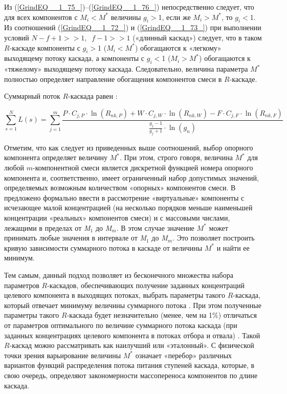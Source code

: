 Из (\ref{GrindEQ__1_75_})--(\ref{GrindEQ__1_76_}) непосредственно следует, что для всех компонентов с $M_{i} $$\mathrm{<}$$M^{*} $ величины $g_{i} $$\mathrm{>}$1, если же $M_{i} $$\mathrm{>}$$M^{*} $, то $g_{i} $$\mathrm{<}$1. Из соотношений (\ref{GrindEQ__1_72_}) и (\ref{GrindEQ__1_73_}) при выполнении условий $N-f+1>>1,\; \; f-1>>1$ («длинный каскад») следует, что в таком $R$-каскаде компоненты с $g_{i} $$\mathrm{>}$1 ($M_{i} $$\mathrm{<}$$M^{*}$) обогащаются к «легкому» выходящему потоку каскада, а компоненты с $g_{i} $$\mathrm{<}$1 ($M_{i} $$\mathrm{>}$$M^{*}$) обогащаются к «тяжелому» выходящему потоку каскада. Следовательно, величина параметра $M^{*}$ полностью определяет направление обогащения компонентов смеси в $R$-каскаде. 

Суммарный поток $R$-каскада равен \cite{sulaberidzeTeoriyaKaskadovDlya2011}:

\begin{equation} \label{GrindEQ__1_77_} 
  \sum _{s=1}^{N}L(s) =\sum _{j=1}^{m}\frac{P \cdot C_{j,P} \cdot \ln(R_{nk,P}) +W \cdot C_{j,W} \cdot \ln(R_{nk,W}) -F \cdot C_{j,F} \cdot \ln(R_{nk,F})}{\frac{g_{j} -1}{g_{j} +1} \cdot \ln(g_{n})}              
\end{equation} 

Отметим, что как следует из приведенных выше соотношений, выбор опорного компонента определяет величину $M^{*}$. При этом, строго говоря, величина $M^{*}$ для любой $m$-компонентной смеси является дискретной функцией номера опорного компонента и, соответственно, имеет ограниченный набор допустимых значений, определяемых возможным количеством «опорных» компонентов смеси. В \cite{sulaberidzeSravnenieOptimalnyhModelnyh2008} предложено формально ввести в рассмотрение «виртуальные» компоненты с исчезающее малой концентрацией (на несколько порядков меньше наименьшей концентрации «реальных» компонентов смеси) и с массовыми числами, лежащими в пределах от \textit{M${}_{1}$} до \textit{M${}_{m}$}. В этом случае значение $M^{*}$ может принимать любые значения в интервале от \textit{M${}_{1}$} до \textit{M${}_{m}$}. Это позволяет построить кривую зависимости суммарного потока в каскаде от величины $M^{*}$ и найти ее минимум.

Тем самым, данный подход позволяет из бесконечного множества набора параметров $R$-каскадов, обеспечивающих получение заданных концентраций целевого компонента в выходящих потоках, выбрать параметры такого $R$-каскада, который отвечает минимуму величины суммарного потока \cite{sulaberidzeSravnenieOptimalnyhModelnyh2008}. При этом полученные параметры такого $R$-каскада будет незначительно (менее, чем на 1\%) отличаться от параметров оптимального по величине суммарного потока каскада (при заданных концентрациях целевого компонента в потоках отбора и отвала) \cite{songComparativeStudyModel2010}. Такой $R$-каскад можно рассматривать как наилучший или «эталонный». С физической точки зрения варьирование величины $M^{*}$ означает «перебор» различных вариантов функций распределения потока питания ступеней каскада, которые, в свою очередь, определяют закономерности массопереноса компонентов по длине каскада.

